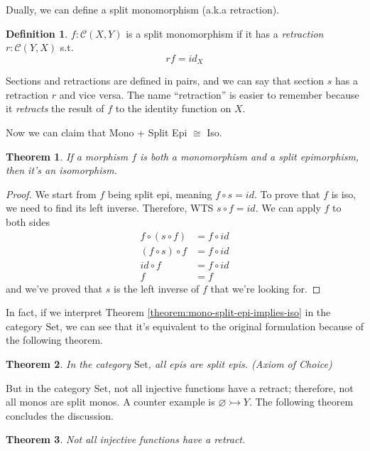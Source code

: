 \documentclass[12pt]{article}
\theoremstyle{plain}
\newtheorem{theorem}{Theorem}
\theoremstyle{definition}
\newtheorem{definition}{Definition}
\theoremstyle{remark}
\newcommand{\cat}[1]{\mathcal{#1}}
\newcommand{\Set}{\mathrm{Set}}
\begin{document}
Dually, we can define a split monomorphism (a.k.a retraction).

\begin{definition}
  $f: \cat{C}(X, Y)$ is a split monomorphism if it has a \emph{retraction} $r: \cat{C}(Y, X)$ s.t. $$r f = id_X$$
\end{definition}

Sections and retractions are defined in pairs, and we can say that section $s$ has a retraction $r$ and vice versa. The name ``retraction'' is easier to remember because it \emph{retracts} the result of $f$ to the identity function on $X$.

Now we can claim that Mono + Split Epi $\cong$ Iso.

\begin{theorem}
  If a morphism $f$ is both a monomorphism and a split epimorphism, then it's an isomorphism.
\end{theorem}
\label{theorem:mono-split-epi-implies-iso}
\begin{proof}
  We start from $f$ being split epi, meaning $f \circ s = id$. To prove that $f$ is iso, we need to find its left inverse.
  Therefore, WTS $s \circ f = id$. We can apply $f$ to both sides
  \begin{align*}
    f \circ (s \circ f) &= f \circ id \\
    (f \circ s) \circ f &= f \circ id \\
    id \circ f &= f \circ id \\
    f &= f
  \end{align*}
  and we've proved that $s$ is the left inverse of $f$ that we're looking for.
\end{proof}

In fact, if we interpret Theorem \ref{theorem:mono-split-epi-implies-iso} in the category $\Set$, we can see that it's equivalent to the original formulation because of the following theorem.

\begin{theorem}
  In the category $\Set$, all epis are split epis. (Axiom of Choice)
\end{theorem}

But in the category $\Set$, not all injective functions have a retract; therefore, not all monos are split monos. A counter example is $\varnothing \rightarrowtail Y$. The following theorem concludes the discussion.

\begin{theorem}
  Not all injective functions have a retract.
\end{theorem}
\end{document}
